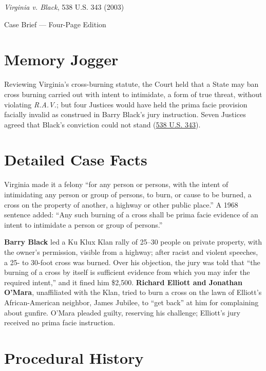 \documentclass[12pt]{article}
\begin{document}
\begin{center}
{\LARGE \textit{Virginia v. Black}, 538 U.S. 343 (2003)\par}
\vspace{0.8em}
{\large Case Brief --- Four-Page Edition\par}
\end{center}
\vspace{1em}

\section{Memory Jogger}

Reviewing Virginia's cross-burning statute, the Court held that a State may ban cross burning carried out with intent to intimidate, a form of true threat, without violating \textit{R.A.V.}; but four Justices would have held the prima facie provision facially invalid as construed in Barry Black's jury instruction. Seven Justices agreed that Black's conviction could not stand (\href{https://supreme.justia.com/cases/federal/us/538/343/}{538 U.S. 343}).

\section{Detailed Case Facts}

Virginia made it a felony ``for any person or persons, with the intent of intimidating any person or group of persons, to burn, or cause to be burned, a cross on the property of another, a highway or other public place.'' A 1968 sentence added: ``Any such burning of a cross shall be prima facie evidence of an intent to intimidate a person or group of persons.''

\textbf{Barry Black} led a Ku Klux Klan rally of 25--30 people on private property, with the owner's permission, visible from a highway; after racist and violent speeches, a 25- to 30-foot cross was burned. Over his objection, the jury was told that ``the burning of a cross by itself is sufficient evidence from which you may infer the required intent,'' and it fined him \$2,500. \textbf{Richard Elliott and Jonathan O'Mara}, unaffiliated with the Klan, tried to burn a cross on the lawn of Elliott's African-American neighbor, James Jubilee, to ``get back'' at him for complaining about gunfire. O'Mara pleaded guilty, reserving his challenge; Elliott's jury received no prima facie instruction.

\section{Procedural History}
\end{document}
